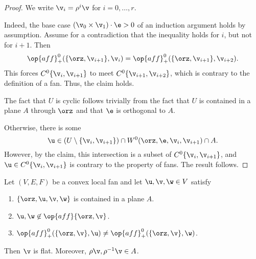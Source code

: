 \begin{proof} 
We write $\v_i = \rho^i \v$ for $i=0,\ldots,r$.

Indeed, the base case $(\v_0\times \v_1)\cdot \e > 0$ of an induction
argument holds by assumption.  Assume for a contradiction that the
inequality holds for $i$, but not for $i+1$.  Then
\[ 
  \op{aff}^0_+(\{\orz,\v_{i+1}\},\v_i) 
= \op{aff}^0_+(\{\orz,\v_{i+1}\},\v_{i+2}).
\]  
This forces $C^0\{\v_i,\v_{i+1}\}$ to meet $C^0\{\v_{i+1},\v_{i+2}\}$,
which is contrary to the definition of a fan.  Thus, the claim holds.

The fact that $U$ is cyclic follows trivially from the fact that $U$
is contained in a plane $A$ through $\orz$ and that $\e$ is orthogonal
to $A$.

Otherwise, there is some 
\[ 
  \u \in (U\setminus \{\v_i,\v_{i+1}\}) 
\cap W^0(\orz,\e,\v_i,\v_{i+1}) \cap A.
\] 
However, by the claim, this intersection is a subset of $C^0\{\v_i,\v_{i+1}\}$, and
$\u\in C^0\{\v_i,\v_{i+1}\}$ is contrary to the property
 of fans.  The result follows.
\end{proof}

\begin{lemma}[] \label{lemma:A}  
Let $(V,E,F)$ be a convex local fan and let
  $\u,\v,\w\in V$ satisfy
\begin{enumerate}\wasitemize 
\item $\{\orz,\u,\v,\w\}$ is contained in a plane $A$. \vspace{3pt}
\item $\u,\w\not\in\op{aff}\{\orz,\v\}$. \vspace{3pt}
\item $\op{aff}^0_+(\{\orz,\v\},\u) \ne \op{aff}^0_+(\{\orz,\v\},\w)$.
\end{enumerate}\wasitemize 
Then $\v$ is flat.  Moreover, $\rho \v,\rho^{-1} \v\in A$.
\end{lemma}

